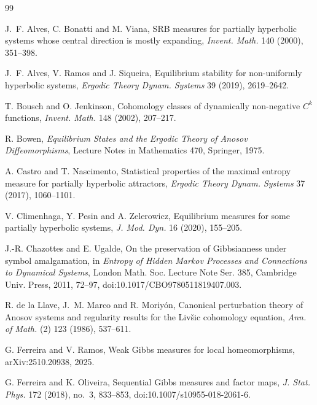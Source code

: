 \documentclass[11pt,a4paper]{article}
\begin{document}
\begin{thebibliography}{99}

J.~F. Alves, C. Bonatti and M. Viana,
\newblock SRB measures for partially hyperbolic systems whose central
direction is mostly expanding,
\newblock \emph{Invent. Math.} 140 (2000), 351--398.

J.~F. Alves, V. Ramos and J. Siqueira,
\newblock Equilibrium stability for non-uniformly hyperbolic systems,
\newblock \emph{Ergodic Theory Dynam. Systems} 39 (2019), 2619--2642.

T. Bousch and O. Jenkinson,
\newblock Cohomology classes of dynamically non-negative $C^k$ functions,
\newblock \emph{Invent. Math.} 148 (2002), 207--217.

R. Bowen,
\newblock \emph{Equilibrium States and the Ergodic Theory of Anosov
Diffeomorphisms},
\newblock Lecture Notes in Mathematics 470, Springer, 1975.

A. Castro and T. Nascimento,
\newblock Statistical properties of the maximal entropy measure for
partially hyperbolic attractors,
\newblock \emph{Ergodic Theory Dynam. Systems} 37 (2017), 1060--1101.

V. Climenhaga, Y. Pesin and A. Zelerowicz,
\newblock Equilibrium measures for some partially hyperbolic systems,
\newblock \emph{J. Mod. Dyn.} 16 (2020), 155--205.


J.-R. Chazottes and E. Ugalde,
\newblock On the preservation of Gibbsianness under symbol amalgamation,
\newblock in \emph{Entropy of Hidden Markov Processes and Connections to
Dynamical Systems}, London Math. Soc. Lecture Note Ser. 385,
Cambridge Univ. Press, 2011, 72--97,
\newblock doi:10.1017/CBO9780511819407.003.

R. de la Llave, J.~M. Marco and R. Moriy\'on,
\newblock Canonical perturbation theory of Anosov systems and regularity
results for the Liv\v{s}ic cohomology equation,
\newblock \emph{Ann. of Math.} (2) 123 (1986), 537--611.

G. Ferreira and V. Ramos,
\newblock Weak Gibbs measures for local homeomorphisms,
\newblock arXiv:2510.20938, 2025.

G. Ferreira and K. Oliveira,
\newblock Sequential Gibbs measures and factor maps,
\newblock \emph{J. Stat. Phys.} 172 (2018), no.~3, 833--853,
\newblock doi:10.1007/s10955-018-2061-6.


\end{thebibliography}
\end{document}
